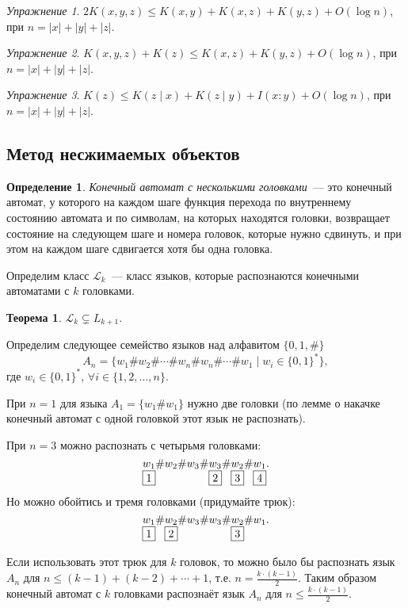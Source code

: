 \documentclass[12pt]{article}
\newcommand{\binstr}{\{0,1\}^*}
\theoremstyle{definition}
\newtheorem{definition}{Определение}
\theoremstyle{plain}
\newtheorem{theorem}{Теорема}[section]
\theoremstyle{remark}
\newtheorem{exercise}{Упражнение}[section]
\begin{document}
\begin{exercise}
    $2K(x,y,z)\le K(x,y) + K(x,z) + K(y,z) + O(\log n)$, при $n = |x|+|y|+|z|$.
\end{exercise}
\begin{exercise}
    $K(x,y,z) + K(z)\le K(x,z) + K(y,z) + O(\log n)$, при $n = |x|+|y|+|z|$.
\end{exercise}
\begin{exercise}
    $K(z)\le K(z\mid x) + K(z\mid y) + I(x:y) + O(\log n)$, при $n = |x|+|y|+|z|$.
\end{exercise}

\subsection{Метод несжимаемых объектов}
\begin{definition}
    \emph{Конечный автомат с несколькими головками}~--- это конечный автомат, у
    которого на каждом шаге функция перехода по внутреннему состоянию автомата
    и по символам, на которых находятся головки, возвращает состояние на
    следующем шаге и номера головок, которые нужно сдвинуть, и при этом на каждом 
    шаге сдвигается хотя бы одна головка.
\end{definition}
    Определим класс $\mathcal L_k$~--- класс языков, которые распознаются
    конечными автоматами с $k$ головками.
\begin{theorem}\label{thm:kDFA}
    $\mathcal L_k \subsetneq L_{k+1}.$
\end{theorem}

Определим следующее семейство языков над алфавитом $\{0,1,\#\}$
\[
A_n = \{w_1\#w_2\#\dotsb\#w_n\#w_n\#\dotsb\#w_1\mid w_i\in\binstr\},
\]
где $w_i\in\binstr$, $\forall i\in\{1,2,\dotsc,n\}$.

При $n = 1$ для языка $A_1 = \{w_1\#w_1\}$ нужно две головки (по лемме о накачке 
конечный автомат с одной головкой этот язык не распознать).

При $n = 3$ можно распознать с четырьмя головками:
\[
\underset{\fbox{1}}{w_1}\#w_2\#w_3\#\underset{\fbox{2}}{w_3}\#\underset{\fbox{3}}{w_2}\#\underset{\fbox{4}}{w_1}.
\]
Но можно обойтись и тремя головками (придумайте трюк):
\[
\underset{\fbox{1}}{w_1}\#\underset{\fbox{2}}{w_2}\#w_3\#w_3\#\underset{\fbox{3}}{w_2}\#w_1.
\]

Если использовать этот трюк для $k$ головок, то можно было бы распознать
язык $A_n$ для $n \le (k-1) + (k-2) + \dotsb + 1$, т.е. $n =
\frac{k\cdot(k-1)}{2}$. Таким образом конечный автомат с $k$ головками 
распознаёт язык $A_n$ для $n \le \frac{k\cdot(k-1)}{2}$.
\end{document}
